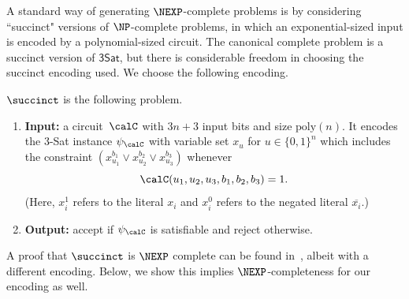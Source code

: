A standard way of generating $\NEXP$-complete problems 
is by considering ``succinct" versions of $\NP$-complete problems,
in which an exponential-sized input is encoded by a polynomial-sized circuit.
The canonical complete problem is a succinct version of $\mathsf{3Sat}$,
but there is considerable freedom in choosing the succinct encoding used.
We choose the following encoding.

\begin{definition}
$\succinct$ is the following problem.
\begin{enumerate}
\item[$\circ$] \textbf{Input:} a circuit~$\calC$ with $3n+3$ input bits and size $\mathrm{poly}(n)$.
It encodes the 3-Sat instance $\psi_{\calC}$ with variable set $x_u$ for $u \in \{0, 1\}^n$
which includes the constraint $(x_{u_1}^{b_1} \lor x_{u_2}^{b_2}\lor x_{u_3}^{b_3})$ whenever
\begin{equation*}
\calC(u_1, u_2, u_3, b_1, b_2, b_3) = 1.
\end{equation*}
(Here, $x_i^1$ refers to the literal $x_i$ and $x_i^0$ refers to the negated literal $\overline{x_i}$.)
\item[$\circ$] \textbf{Output:} accept if $\psi_{\calC}$ is satisfiable and reject otherwise.
\end{enumerate}
\end{definition}

A proof that $\succinct$ is $\NEXP$ complete can be found in~\cite[Chapter 20]{Pap94},
albeit with a different encoding.
Below, we show this implies $\NEXP$-completeness for our encoding as well.

